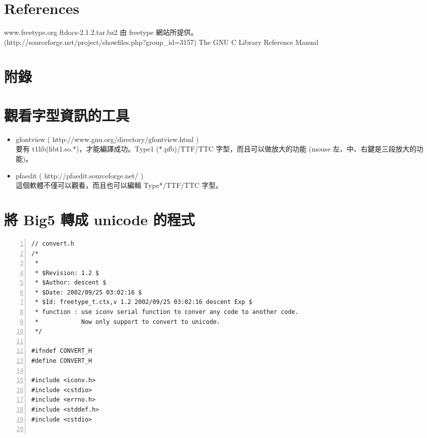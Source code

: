 \documentclass[12pt,a4]{article}
\begin{document}
\begin{CJK}{UTF8}{cwmu}
\newpage
\section{References}
\begin{thebibliography}{99}
www.freetype.org
ftdocs-2.1.2.tar.bz2 由 freetype 網站所提供。\\
(http://sourceforge.net/project/showfiles.php?group\_{}id=3157)
The GNU C Library Reference Manual
\end{thebibliography}

\newpage
\section{附錄}
\appendix
\section{觀看字型資訊的工具}
\begin{itemize}
\item
gfontview ( http://www.gnu.org/directory/gfontview.html )\\
要有 t1lib(libt1.so.*)，才能編譯成功。Type1 (*.pfb)/TTF/TTC 字型，而且可以做放大的功能 (mouse 左、中、右鍵是三段放大的功能)。
\item
pfaedit ( http://pfaedit.sourceforge.net/ )\\ 
這個軟體不僅可以觀看，而且也可以編輯 Type*/TTF/TTC 字型。 
\newpage
\end{itemize}
\section{\label{big52unicode}將 Big5 轉成 unicode 的程式}
\begin{Verbatim}[commandchars=@\^?,numbers=left]
// convert.h
/*
 *
 * $Revision: 1.2 $
 * $Author: descent $
 * $Date: 2002/09/25 03:02:16 $
 * $Id: freetype_t.ctx,v 1.2 2002/09/25 03:02:16 descent Exp $
 * function : use iconv serial function to conver any code to another code.
 *            Now only support to convert to unicode. 
 */

#ifndef CONVERT_H
#define CONVERT_H

#include <iconv.h>
#include <cstdio>
#include <errno.h>
#include <stddef.h>
#include <cstdio>


\end{Verbatim}
\end{CJK}
\end{document}
